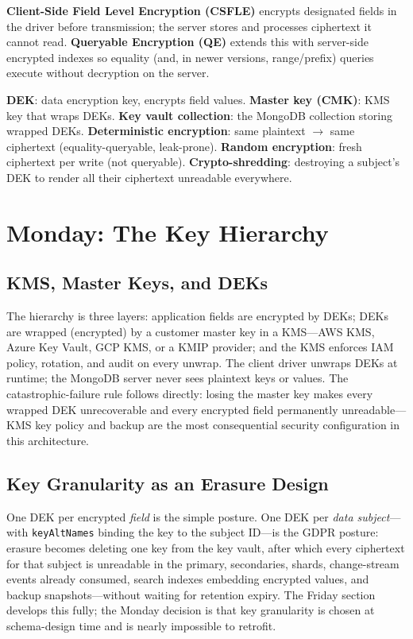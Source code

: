 \begin{definitionbox}
\textbf{Client-Side Field Level Encryption (CSFLE)} encrypts designated fields in the driver before transmission; the server stores and processes ciphertext it cannot read. \textbf{Queryable Encryption (QE)} extends this with server-side encrypted indexes so equality (and, in newer versions, range/prefix) queries execute without decryption on the server.
\end{definitionbox}

\begin{keyterms}
\textbf{DEK}: data encryption key, encrypts field values. \textbf{Master key (CMK)}: KMS key that wraps DEKs. \textbf{Key vault collection}: the MongoDB collection storing wrapped DEKs. \textbf{Deterministic encryption}: same plaintext $\to$ same ciphertext (equality-queryable, leak-prone). \textbf{Random encryption}: fresh ciphertext per write (not queryable). \textbf{Crypto-shredding}: destroying a subject's DEK to render all their ciphertext unreadable everywhere.
\end{keyterms}

\section{Monday: The Key Hierarchy}
\subsection{KMS, Master Keys, and DEKs}
The hierarchy is three layers: application fields are encrypted by DEKs; DEKs are wrapped (encrypted) by a customer master key in a KMS---AWS KMS, Azure Key Vault, GCP KMS, or a KMIP provider; and the KMS enforces IAM policy, rotation, and audit on every unwrap. The client driver unwraps DEKs at runtime; the MongoDB server never sees plaintext keys or values. The catastrophic-failure rule follows directly: losing the master key makes every wrapped DEK unrecoverable and every encrypted field permanently unreadable---KMS key policy and backup are the most consequential security configuration in this architecture.

\subsection{Key Granularity as an Erasure Design}
One DEK per encrypted \emph{field} is the simple posture. One DEK per \emph{data subject}---with \texttt{keyAltNames} binding the key to the subject ID---is the GDPR posture: erasure becomes deleting one key from the key vault, after which every ciphertext for that subject is unreadable in the primary, secondaries, shards, change-stream events already consumed, search indexes embedding encrypted values, and backup snapshots---without waiting for retention expiry. The Friday section develops this fully; the Monday decision is that key granularity is chosen at schema-design time and is nearly impossible to retrofit.

